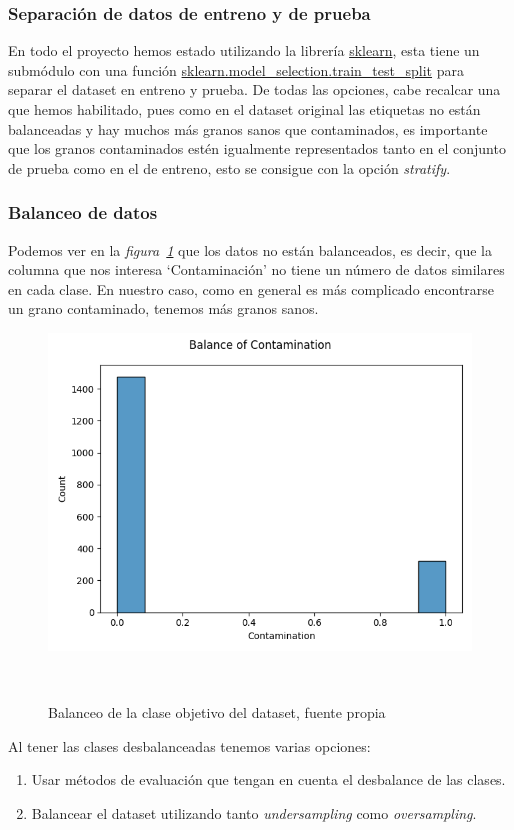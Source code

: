 \subsubsection{Separación de datos de entreno y de prueba}

En todo el proyecto hemos estado utilizando la librería \href{https://scikit-learn.org/stable/}{sklearn}, esta tiene un submódulo con una función \href{https://scikit-learn.org/stable/modules/generated/sklearn.model_selection.train_test_split.html}{sklearn.model\_selection.train\_test\_split} para separar el \gls{dataset} en entreno y prueba. De todas las opciones, cabe recalcar una que hemos habilitado, pues como en el \gls{dataset} original las etiquetas no están balanceadas y hay muchos más granos sanos que contaminados, es importante que los granos contaminados estén igualmente representados tanto en el conjunto de prueba como en el de entreno, esto se consigue con la opción \textit{stratify}.


\subsubsection{Balanceo de datos}

Podemos ver en la \textit{figura\ \ref{fig:unbalance}} que los datos no están balanceados, es decir, que la columna que nos interesa `Contaminación' no tiene un número de datos similares en cada clase. En nuestro caso, como en general es más complicado encontrarse un grano contaminado, tenemos más granos sanos.

\begin{figure}[!h]
    \centering
    \includegraphics[width=0.5\linewidth]{media/images/unabalance.png}
    \caption{Balanceo de la clase objetivo del \gls{dataset}, fuente propia}\ \label{fig:unbalance}
\end{figure}

Al tener las clases desbalanceadas tenemos varias opciones:
\begin{enumerate}
    \item Usar métodos de evaluación que tengan en cuenta el desbalance de las clases.
    \item Balancear el \gls{dataset} utilizando tanto \textit{undersampling} como \textit{oversampling}.
\end{enumerate}

